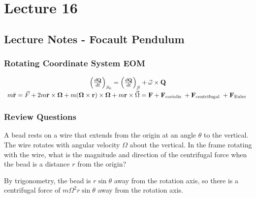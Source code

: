 \documentclass[../PHYS306Notes.tex]{subfiles}
\begin{document}
\section{Lecture 16}
\subsection{Lecture Notes - Focault Pendulum}
\subsubsection{Rotating Coordinate System EOM}
\[
\begin{array}{c}
\left(\frac{d \mathbf{Q}}{d t}\right)_{S_{0}}=\left(\frac{d \mathbf{Q}}{d t}\right)_{S}+\vec{\omega} \times \mathbf{Q} \\
m \ddot{\mathbf{r}}=\vec{F}+2 m \dot{\mathbf{r}} \times \mathbf{\Omega}+m(\mathbf{\Omega} \times \mathbf{r}) \times \mathbf{\Omega}+m \mathbf{r} \times \dot{\vec{\Omega}}=\mathbf{F}+\mathbf{F}_{\text {coriolis }}+\mathbf{F}_{\text {centrifugal }}+\mathbf{F}_{\text {Euler }}
\end{array}
\]

\subsubsection{Review Questions}
A bead rests on a wire that extends from the origin at an angle $\theta$ to the vertical. The wire rotates with angular velocity $\Omega$ about the vertical. In the frame rotating with the wire, what is the magnitude and direction of the centrifugal force when the bead is a distance $r$ from the origin?
\begin{s}
By trigonometry, the bead is $r\sin\theta$ away from the rotation axis, so there is a centrifugal force of $m\Omega^2r\sin\theta$ away from the rotation axis.
\end{s}
\end{document}
